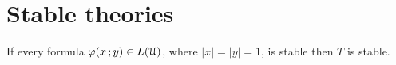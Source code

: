 



\section{Stable theories}
\label{stable_theories}

\def\medrel#1{\parbox[t]{6ex}{$\displaystyle\hfil #1$}}
\def\ceq#1#2#3{\parbox{15ex}{$\displaystyle #1$}\medrel{#2}$\displaystyle  #3$}

\begin{theorem}
  If every formula $\varphi(x\,;y)\in L(\EuScript U)$, where $|x|=|y|=1$, is stable then $T$ is stable.
\end{theorem}

